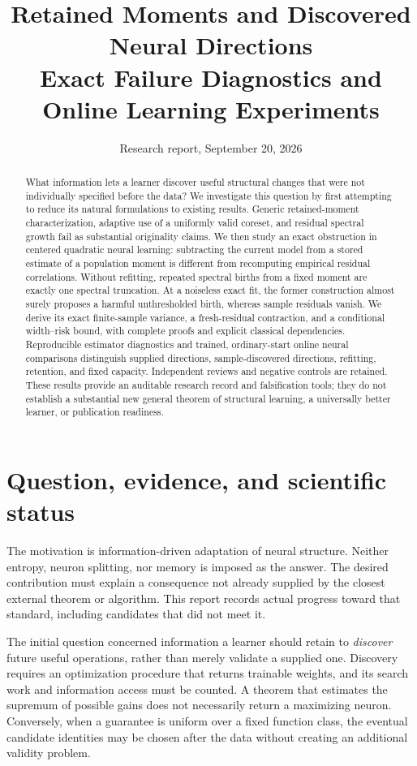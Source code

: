 \documentclass[11pt]{article}
\title{Retained Moments and Discovered Neural Directions\\[5pt]
\large Exact Failure Diagnostics and Online Learning Experiments}
\date{Research report, September 20, 2026}
\theoremstyle{remark}\newtheorem{remark}[theorem]{Remark}
\begin{document}
\maketitle
\begin{abstract}
What information lets a learner discover useful structural changes that were
not individually specified before the data? We investigate this question by
first attempting to reduce its natural formulations to existing results.
Generic retained-moment characterization, adaptive use of a uniformly valid
coreset, and residual spectral growth fail as substantial originality claims.
We then study an exact obstruction in centered quadratic neural learning:
subtracting the current model from a stored estimate of a population moment
is different from recomputing empirical residual correlations. Without
refitting, repeated spectral births from a fixed moment are exactly one
spectral truncation. At a noiseless exact fit, the former construction almost
surely proposes a harmful unthresholded birth, whereas sample residuals
vanish. We derive its exact finite-sample variance, a fresh-residual contraction,
and a conditional width--risk bound, with complete proofs and explicit
classical dependencies. Reproducible estimator diagnostics and trained,
ordinary-start online neural comparisons distinguish supplied directions,
sample-discovered directions, refitting, retention, and fixed capacity.
Independent reviews and negative controls are retained. These results provide
an auditable research record and falsification tools; they do not establish
a substantial new general theorem of structural learning, a universally
better learner, or publication readiness.
\end{abstract}
\tableofcontents

\section{Question, evidence, and scientific status}
The motivation is information-driven adaptation of neural structure. Neither
entropy, neuron splitting, nor memory is imposed as the answer. The desired
contribution must explain a consequence not already supplied by the closest
external theorem or algorithm. This report records actual progress toward
that standard, including candidates that did not meet it.

The initial question concerned information a learner should retain to
\emph{discover} future useful operations, rather than merely validate a supplied
one. Discovery requires an optimization procedure that returns trainable
weights, and its search work and information access must be counted. A theorem
that estimates the supremum of possible gains does not necessarily return a
maximizing neuron. Conversely, when a guarantee is uniform over a fixed
function class, the eventual candidate identities may be chosen after the data
without creating an additional validity problem.
\end{document}
